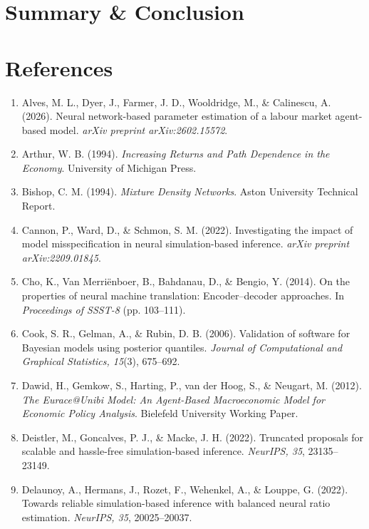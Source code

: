 \documentclass[12pt]{article}
\begin{document}
\section{Summary \& Conclusion}

\section{References}
\begin{enumerate}


\item Alves, M. L., Dyer, J., Farmer, J. D., Wooldridge, M., \& Calinescu, A. (2026). Neural network-based parameter estimation of a labour market agent-based model. \textit{arXiv preprint arXiv:2602.15572}.

\item Arthur, W. B. (1994). \textit{Increasing Returns and Path Dependence in the Economy}. University of Michigan Press.

\item Bishop, C. M. (1994). \textit{Mixture Density Networks}. Aston University Technical Report.

\item Cannon, P., Ward, D., \& Schmon, S. M. (2022). Investigating the impact of model misspecification in neural simulation-based inference. \textit{arXiv preprint arXiv:2209.01845}.

\item Cho, K., Van Merriënboer, B., Bahdanau, D., \& Bengio, Y. (2014). On the properties of neural machine translation: Encoder–decoder approaches. In \textit{Proceedings of SSST-8} (pp. 103--111).

\item Cook, S. R., Gelman, A., \& Rubin, D. B. (2006). Validation of software for Bayesian models using posterior quantiles. \textit{Journal of Computational and Graphical Statistics, 15}(3), 675--692.

\item Dawid, H., Gemkow, S., Harting, P., van der Hoog, S., \& Neugart, M. (2012). \textit{The Eurace@Unibi Model: An Agent-Based Macroeconomic Model for Economic Policy Analysis}. Bielefeld University Working Paper.

\item Deistler, M., Goncalves, P. J., \& Macke, J. H. (2022). Truncated proposals for scalable and hassle-free simulation-based inference. \textit{NeurIPS, 35}, 23135--23149.

\item Delaunoy, A., Hermans, J., Rozet, F., Wehenkel, A., \& Louppe, G. (2022). Towards reliable simulation-based inference with balanced neural ratio estimation. \textit{NeurIPS, 35}, 20025--20037.


\end{enumerate}
\end{document}

